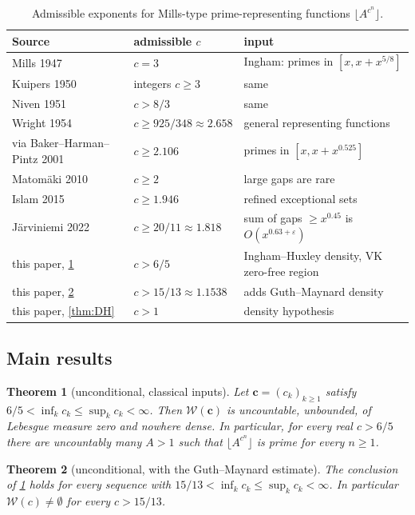 \documentclass[11pt,a4paper]{article}
\newtheorem{theorem}{Theorem}[section]
\theoremstyle{definition}
\newcommand{\W}{\mathcal{W}}
\newcommand{\fl}[1]{\lfloor #1\rfloor}
\newcommand{\eps}{\varepsilon}
\begin{document}
\begin{table}[ht]
\centering\small
\caption{Admissible exponents for Mills-type prime-representing functions $\fl{A^{c^n}}$.}
\label{tab:history}
\begin{tabular}{@{}lll@{}}
\toprule
Source & admissible $c$ & input \\
\midrule
Mills 1947 \cite{Mil47} & $c=3$ & Ingham: primes in $[x,x+x^{5/8}]$\\
Kuipers 1950 \cite{Kui50} & integers $c\ge3$ & same\\
Niven 1951 \cite{Niv51} & $c>8/3$ & same\\
Wright 1954 \cite{Wri54} & $c\ge 925/348\approx2.658$ & general representing functions\\
via Baker--Harman--Pintz 2001 \cite{BHP01} & $c\ge 2.106$ & primes in $[x,x+x^{0.525}]$\\
Matomäki 2010 \cite{Mat10} & $c\ge 2$ & large gaps are rare \cite{Mat07}\\
Islam 2015 \cite{Isl15} & $c\ge 1.946$ & refined exceptional sets\\
Järviniemi 2022 \cite{Jar22} & $c\ge 20/11\approx1.818$ & sum of gaps $\ge x^{0.45}$ is $O(x^{0.63+\eps})$\\
\midrule
this paper, \cref{thm:main} & $c>6/5$ & Ingham--Huxley density, VK zero-free region\\
this paper, \cref{thm:main-GM} & $c>15/13\approx1.1538$ & adds Guth--Maynard density \cite{GM24}\\
this paper, \cref{thm:DH} & $c>1$ & density hypothesis\\
\bottomrule
\end{tabular}
\end{table}

\subsection{Main results}

\begin{theorem}[unconditional, classical inputs]\label{thm:main}
Let $\mathbf c=(c_k)_{k\ge1}$ satisfy $6/5<\inf_k c_k\le\sup_k c_k<\infty$. Then $\W(\mathbf c)$ is uncountable,
unbounded, of Lebesgue measure zero and nowhere dense. In particular, for every real $c>6/5$ there are
uncountably many $A>1$ such that $\fl{A^{c^n}}$ is prime for every $n\ge1$.
\end{theorem}

\begin{theorem}[unconditional, with the Guth--Maynard estimate]\label{thm:main-GM}
The conclusion of \cref{thm:main} holds for every sequence with $15/13<\inf_k c_k\le\sup_k c_k<\infty$.
In particular $\W(c)\neq\emptyset$ for every $c>15/13$.
\end{theorem}
\end{document}
